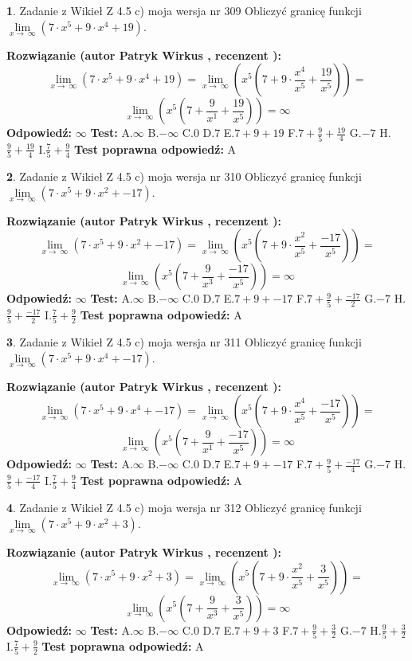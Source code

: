 \documentclass[12pt, a4paper]{article}
\theoremstyle{definition} %
\newtheorem{zad}{}
\newcommand{\zadStart}[1]{\begin{zad}#1\newline}
\newcommand{\zadStop}{\end{zad}}
\newcommand{\rozwStart}[2]{\noindent \textbf{Rozwiązanie (autor #1 , recenzent #2): }\newline}
\newcommand{\rozwStop}{\newline}
\newcommand{\odpStart}{\noindent \textbf{Odpowiedź:}\newline}
\newcommand{\odpStop}{\newline}
\newcommand{\testStart}{\noindent \textbf{Test:}\newline}
\newcommand{\testStop}{\newline}
\newcommand{\kluczStart}{\noindent \textbf{Test poprawna odpowiedź:}\newline}
\newcommand{\kluczStop}{\newline}
\begin{document}
\zadStart{Zadanie z Wikieł Z 4.5 c) moja wersja nr 309}
Obliczyć granicę funkcji  $\lim\limits_{x\to\ \infty}(7 \cdot x^{5}+9 \cdot x^{4}+19)$.
\zadStop
\rozwStart{Patryk Wirkus}{}
$$\lim\limits_{x\to\ \infty}(7 \cdot x^{5}+9 \cdot x^{4}+19) = \lim\limits_{x\to\ \infty}(x^{5}(7 +9 \cdot \frac{x^{4}}{x^{5}}+\frac{19}{x^{5}})) =$$ $$\lim\limits_{x\to\ \infty}(x^{5}(7 +\frac{9}{x^{1}}+\frac{19}{x^{5}})) =\infty$$
\rozwStop
\odpStart
$\infty$
\odpStop
\testStart
A.$\infty$ B.$-\infty$ C.$0$ D.$7$ E.$7 + 9 + 19$
F.$7+\frac{9}{5}+\frac{19}{4}$ G.$-7$
H.$\frac{9}{5}+\frac{19}{4}$
I.$\frac{7}{5}+\frac{9}{4}$
\testStop
\kluczStart
A
\kluczStop



\zadStart{Zadanie z Wikieł Z 4.5 c) moja wersja nr 310}
Obliczyć granicę funkcji  $\lim\limits_{x\to\ \infty}(7 \cdot x^{5}+9 \cdot x^{2}+-17)$.
\zadStop
\rozwStart{Patryk Wirkus}{}
$$\lim\limits_{x\to\ \infty}(7 \cdot x^{5}+9 \cdot x^{2}+-17) = \lim\limits_{x\to\ \infty}(x^{5}(7 +9 \cdot \frac{x^{2}}{x^{5}}+\frac{-17}{x^{5}})) =$$ $$\lim\limits_{x\to\ \infty}(x^{5}(7 +\frac{9}{x^{3}}+\frac{-17}{x^{5}})) =\infty$$
\rozwStop
\odpStart
$\infty$
\odpStop
\testStart
A.$\infty$ B.$-\infty$ C.$0$ D.$7$ E.$7 + 9 + -17$
F.$7+\frac{9}{5}+\frac{-17}{2}$ G.$-7$
H.$\frac{9}{5}+\frac{-17}{2}$
I.$\frac{7}{5}+\frac{9}{2}$
\testStop
\kluczStart
A
\kluczStop



\zadStart{Zadanie z Wikieł Z 4.5 c) moja wersja nr 311}
Obliczyć granicę funkcji  $\lim\limits_{x\to\ \infty}(7 \cdot x^{5}+9 \cdot x^{4}+-17)$.
\zadStop
\rozwStart{Patryk Wirkus}{}
$$\lim\limits_{x\to\ \infty}(7 \cdot x^{5}+9 \cdot x^{4}+-17) = \lim\limits_{x\to\ \infty}(x^{5}(7 +9 \cdot \frac{x^{4}}{x^{5}}+\frac{-17}{x^{5}})) =$$ $$\lim\limits_{x\to\ \infty}(x^{5}(7 +\frac{9}{x^{1}}+\frac{-17}{x^{5}})) =\infty$$
\rozwStop
\odpStart
$\infty$
\odpStop
\testStart
A.$\infty$ B.$-\infty$ C.$0$ D.$7$ E.$7 + 9 + -17$
F.$7+\frac{9}{5}+\frac{-17}{4}$ G.$-7$
H.$\frac{9}{5}+\frac{-17}{4}$
I.$\frac{7}{5}+\frac{9}{4}$
\testStop
\kluczStart
A
\kluczStop



\zadStart{Zadanie z Wikieł Z 4.5 c) moja wersja nr 312}
Obliczyć granicę funkcji  $\lim\limits_{x\to\ \infty}(7 \cdot x^{5}+9 \cdot x^{2}+3)$.
\zadStop
\rozwStart{Patryk Wirkus}{}
$$\lim\limits_{x\to\ \infty}(7 \cdot x^{5}+9 \cdot x^{2}+3) = \lim\limits_{x\to\ \infty}(x^{5}(7 +9 \cdot \frac{x^{2}}{x^{5}}+\frac{3}{x^{5}})) =$$ $$\lim\limits_{x\to\ \infty}(x^{5}(7 +\frac{9}{x^{3}}+\frac{3}{x^{5}})) =\infty$$
\rozwStop
\odpStart
$\infty$
\odpStop
\testStart
A.$\infty$ B.$-\infty$ C.$0$ D.$7$ E.$7 + 9 + 3$
F.$7+\frac{9}{5}+\frac{3}{2}$ G.$-7$
H.$\frac{9}{5}+\frac{3}{2}$
I.$\frac{7}{5}+\frac{9}{2}$
\testStop
\kluczStart
A
\kluczStop
\end{document}
